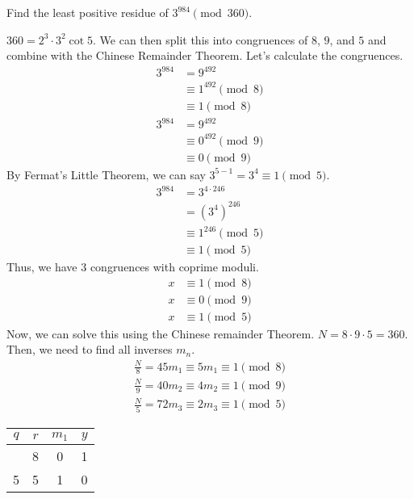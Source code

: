 \documentclass{article}
\begin{document}
\begin{problem}{}{}
    Find the least positive residue of $3^{984} \pmod{360}$.
\end{problem}
\begin{solution}{}{}
    $360=2^3\cdot3^2\cot5$. We can then split this into congruences of $8$, $9$, and $5$ and combine with the Chinese Remainder Theorem. Let's calculate the congruences.
    \begin{align*}
        3^{984}&=9^{492}\\
        &\equiv 1^{492} \pmod{8} \\
        &\equiv 1 \pmod{8}
    \end{align*}
    \begin{align*}
        3^{984}&=9^{492}\\
        &\equiv 0^{492} \pmod{9} \\
        &\equiv 0 \pmod{9}
    \end{align*}
    By Fermat's Little Theorem, we can say $3^{5-1}=3^4\equiv 1 \pmod{5}$.
    \begin{align*}
        3^{984}&=3^{4\cdot246}\\
        &= (3^4)^{246}\\
        &\equiv 1^{246} \pmod{5}\\
        &\equiv 1 \pmod{5}
    \end{align*}
    Thus, we have 3 congruences with coprime moduli.
    \begin{align*}
        x &\equiv 1 \pmod{8} \\
        x &\equiv 0 \pmod{9} \\
        x &\equiv 1 \pmod{5}
    \end{align*}
    Now, we can solve this using the Chinese remainder Theorem. $N=8\cdot9\cdot5=360$. Then, we need to find all inverses $m_n$.
    \begin{align*}
        \frac{N}{8} = 45m_1 \equiv 5m_1 \equiv 1 \pmod{8}\\
        \frac{N}{9} = 40m_2 \equiv 4m_2 \equiv 1 \pmod{9} \\
        \frac{N}{5} = 72m_3 \equiv 2m_3 \equiv 1 \pmod{5}
    \end{align*}
    \begin{center}
        \begin{tabular}{c c c c}
            $q$ & $r$ & $m_1$ & $y$ \\
            \hline
            & 8 & 0 & 1 \\
            5 & 5 & 1 & 0 \\

\end{tabular}
\end{center}
\end{solution}
\end{document}
